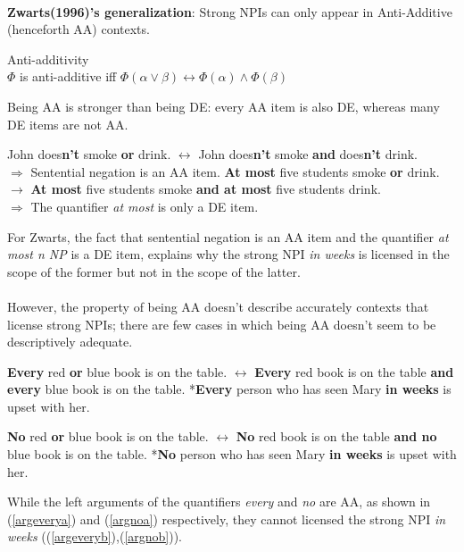\documentclass[a4paper,11pt]{article}
\newcommand{\reff}[1]{(\ref{#1})}
\begin{document}
\paragraph{}
\textbf{Zwarts(1996)'s generalization}: Strong NPIs can only appear in Anti-Additive (henceforth AA) contexts. 
\begin{exe}
\ex\label{aa} Anti-additivity \\$\Phi$ is anti-additive iff $\Phi(\alpha\vee\beta) \leftrightarrow \Phi(\alpha)\wedge \Phi(\beta)$
\end{exe}
Being AA is stronger than being DE: every AA item is also DE, whereas many DE items are not AA.
\begin{exe}
\ex\label{aa1} \begin{xlist}
\ex\label{aaneg} John does\textbf{n't} smoke \textbf{or} drink. $\leftrightarrow$ John does\textbf{n't} smoke \textbf{and} does\textbf{n't} drink.
\\$\Rightarrow$ Sentential negation is an AA item.
\ex\label{aaatmost} \textbf{At most} five students smoke \textbf{or} drink. $\rightarrow$ \textbf{At most} five students smoke \textbf{and at most} five students drink.
\\$\Rightarrow$ The quantifier \textit{at most} is only a DE item.
\end{xlist}
\end{exe}
For Zwarts, the fact that sentential negation is an AA item and the quantifier \textit{at most n NP} is a DE item, explains why the strong NPI \textit{in weeks} is licensed in the scope of the former but not in the scope of the latter.
\paragraph{}
However, the property of being AA doesn't describe accurately contexts that license strong NPIs; there are few cases in which being AA doesn't seem to be descriptively adequate.
\begin{exe}
\ex\label{everyno} \begin{xlist}
\ex\label{argevery} \begin{xlist}
\ex\label{argeverya} \textbf{Every} red \textbf{or} blue book is on the table. $\leftrightarrow$ \textbf{Every} red book is on the table \textbf{and every} blue book is on the table.
\ex\label{argeveryb} *\textbf{Every} person who has seen Mary \textbf{in weeks} is upset with her.
\end{xlist}
\ex\label{argno} \begin{xlist}
\ex\label{argnoa} \textbf{No} red \textbf{or} blue book is on the table. $\leftrightarrow$ \textbf{No} red book is on the table \textbf{and no} blue book is on the table.
\ex\label{argnob} *\textbf{No} person who has seen Mary \textbf{in weeks} is upset with her.
\end{xlist}
\end{xlist}
\end{exe}
While the left arguments of the quantifiers \textit{every} and \textit{no} are AA, as shown in \reff{argeverya} and \reff{argnoa} respectively, they cannot licensed the strong NPI \textit{in weeks} (\reff{argeveryb},\reff{argnob}).
\end{document}
